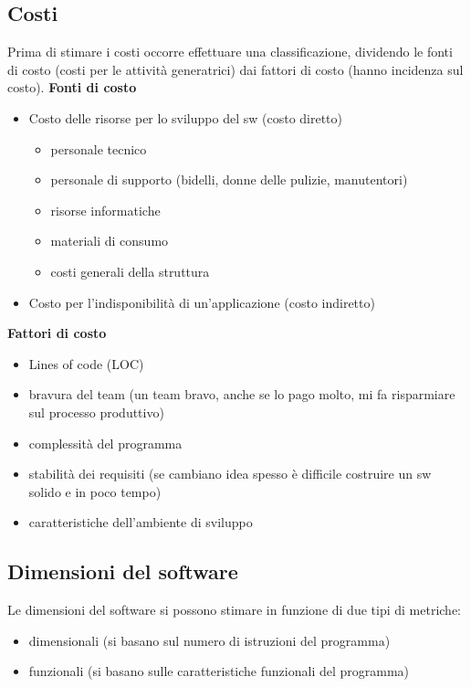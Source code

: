 \documentclass[a4paper,12pt]{report}
\begin{document}
	\subsection{Costi}
	Prima di stimare i costi occorre effettuare una classificazione, dividendo le fonti di costo (costi per le attività generatrici) dai fattori di costo (hanno incidenza sul costo).
	\textbf{Fonti di costo}
	\begin{itemize}
		\item Costo delle risorse per lo sviluppo del sw (costo diretto)
		\begin{itemize}
			\item personale tecnico
			\item personale di supporto (bidelli, donne delle pulizie, manutentori)
			\item risorse informatiche
			\item materiali di consumo
			\item costi generali della struttura
		\end{itemize}
		\item Costo per l'indisponibilità di un'applicazione (costo indiretto)
	\end{itemize}
	\textbf{Fattori di costo}
	\begin{itemize}
		\item Lines of code (LOC)
		\item bravura del team (un team bravo, anche se lo pago molto, mi fa risparmiare sul processo produttivo)
		\item complessità del programma
		\item stabilità dei requisiti (se cambiano idea spesso è difficile costruire un sw solido e in poco tempo)
		\item caratteristiche dell'ambiente di sviluppo
	\end{itemize}
	\subsection{Dimensioni del software}
	Le dimensioni del software si possono stimare in funzione di due tipi di metriche:
	\begin{itemize}
		\item dimensionali (si basano sul numero di istruzioni del programma)
		\item funzionali (si basano sulle caratteristiche funzionali del programma)
	\end{itemize}
\end{document}
